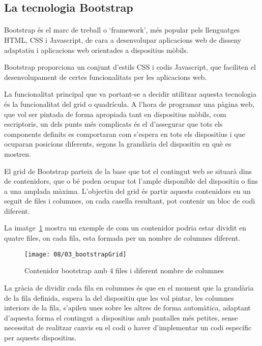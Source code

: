 \subsection{La tecnologia Bootstrap}\label{sec:bootstrap}

    \paragraph{}
    Bootstrap és el marc de treball o `framework', més popular pels llenguatges HTML, CSS i Javascript, de cara a desenvolupar aplicacions web de disseny adaptatiu i aplicacions web orientades a dispositius mòbils.

    Bootstrap proporciona un conjunt d'estils CSS i codis Javascript, que faciliten el desenvolupament de certes funcionalitats per les aplicacions web.

    La funcionalitat principal que va portant-se a decidir utilitzar aquesta tecnologia és la funcionalitat del grid o quadrícula. A l'hora de programar una pàgina web, que vol ser pintada de forma apropiada tant en dispositius mòbils, com escriptoris, un dels punts més complicats és el d'assegurar que tots els components definits es comportaran com s'espera en tots els dispositius i que ocuparan posicions diferents, segons la grandària del dispositiu en què es mostren.

    El grid de Bootstrap parteix de la base que tot el contingut web se situarà dins de contenidors, que o bé poden ocupar tot l'ample disponible del dispositiu o fins a una amplada màxima. L’objectiu del grid és partir aquests contenidors en un seguit de files i columnes, on cada casella resultant, pot contenir un bloc de codi diferent.

    La imatge~\ref{img:gridSimple} mostra un exemple de com un contenidor podria estar dividit en quatre files, on cada fila, esta formada per un nombre de columnes diferent.

    \begin{figure}[h]
        \texttt{[image: 08/03\_bootstrapGrid]}
        \centering
        \caption{Contenidor bootstrap amb 4 files i diferent nombre de columnes}\label{img:gridSimple}
    \end{figure}

    La gràcia de dividir cada fila en columnes és que en el moment que la grandària de la fila definida, supera la del dispositiu que les vol pintar, les columnes interiors de la fila, s'apilen unes sobre les altres de forma automàtica, adaptant d'aquesta forma el contingut a dispositius amb pantalles més petites, sense necessitat de realitzar canvis en el codi o haver d'implementar un codi específic per aquests dispositius.


